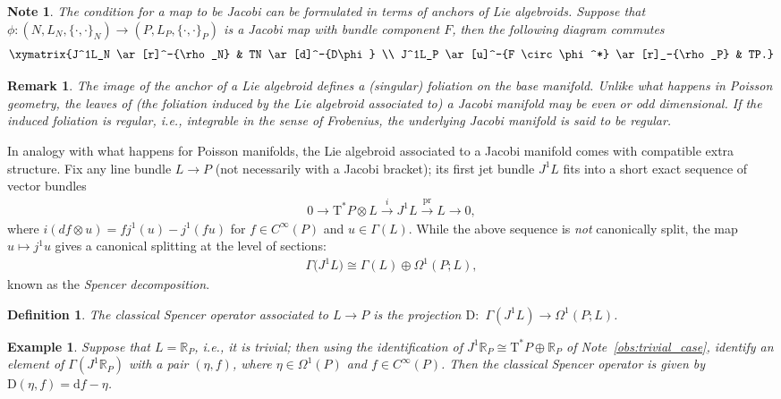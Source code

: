 \documentclass[10pt,a4paper]{amsart}
\numberwithin{equation}{section}
\newtheorem{Definition}[Theorem]{Definition}
\newtheorem{Note}[Theorem]{Note}
\newtheorem{Example}[Theorem]{Example}
\newtheorem{Remark}[Theorem]{Remark} }
\newcommand{\rmap}{\to}
\newcommand{\de}{\mathrm{d}} %
\newcommand{\cotan}{\mathrm{T}^*} %
\newcommand{\RR}{\mathbb{R}}
\begin{document}
\begin{Note}\label{obs:Jac_maps}
The condition for a map to be Jacobi can be formulated in terms of anchors of Lie algebroids. Suppose that $\phi\colon (N, L_N,\{\cdot,\cdot\}_N) \to (P, L_P, \{\cdot,\cdot\}_P)$ is a Jacobi map with bundle component $F$, then the following diagram commutes
 \begin{gather*}
 \xymatrix{J^1L_N \ar[r]^-{\rho_N} & TN \ar[d]^-{D\phi} \\
 J^1L_P \ar[u]^-{F \circ \phi^*} \ar[r]_-{\rho_P} & TP.}
 \end{gather*}
\end{Note}

\begin{Remark}\label{rk:leaves}
 The image of the anchor of a Lie algebroid def\/ines a (singular) foliation on the base manifold. Unlike what happens in Poisson geometry, the leaves of (the foliation induced by the Lie algebroid associated to) a Jacobi manifold may be even or odd dimensional. If the induced foliation is regular, i.e., integrable in the sense of Frobenius, the underlying Jacobi manifold is said to be {\it regular}.
\end{Remark}

In analogy with what happens for Poisson manifolds, the Lie algebroid associated to a Jacobi manifold comes with compatible extra structure. Fix any line bundle $L \to P$ (not necessarily with a Jacobi bracket); its f\/irst jet bundle $J^1L$ f\/its into a short exact sequence of vector bundles
\begin{gather*}
 0\rmap \cotan P \otimes L \stackrel{i}{\to} J^1L \stackrel{\operatorname{pr}}{\to} L\rmap 0,
\end{gather*}
where $ i(df\otimes u)= f j^1(u)- j^1(fu)$ for $f \in C^{\infty}(P)$ and $u \in \Gamma(L)$. While the above sequence is {\em not} canonically split, the map $u\mapsto j^1u$ gives a canonical splitting at the level of sections:
\begin{gather*} \Gamma\big(J^1L\big)\cong \Gamma(L)\oplus\Omega^1(P;L), \end{gather*}
known as the {\it Spencer decomposition}.

\begin{Definition}\label{defn:cso}
The {\it classical Spencer operator} associated to $L \to P$ is the projection $\mathrm{D}\colon$ $\Gamma(J^1L) \to\Omega^1(P;L)$.
\end{Definition}

\begin{Example}\label{exm:spencer_trivial}
Suppose that $L = \RR_P$, i.e., it is trivial; then using the identif\/ication of $J^1 \RR_P \cong \cotan P \oplus \RR_P$ of Note~\ref{obs:trivial_case}, identify an element of $\Gamma(J^1 \RR_P)$ with a pair $(\eta,f)$, where $\eta \in \Omega^1(P)$ and $f \in C^{\infty}(P)$. Then the classical Spencer operator is given by $\mathrm{D}(\eta,f) = \de f - \eta$.
\end{Example}
\end{document}
